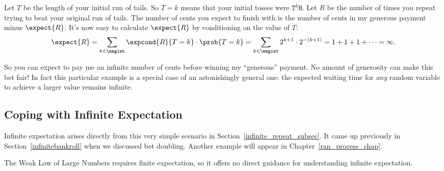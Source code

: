 Let $T$ be the length of your initial run of tails.  So $T = k$ means
that your initial tosses were $\texttt{T}^k\texttt{H}$.  Let $R$ be
the number of times you repeat trying to beat your original run of
tails.  The number of cents you expect to finish with is the number of
cents in my generous payment minus $\expect{R}$.  It's now easy to
calculate $\expect{R}$ by conditioning on the value of $T$:
\[
\expect{R}
     = \sum_{k \in \nngint} \expcond{R}{T=k} \cdot \prob{T=k}
     = \sum_{k \in \nngint}  2^{k+1} \cdot 2^{-(k+1)}
     = 1 + 1 + 1+ \cdots = \infty.
\]

\iffalse
\begin{align*}
\expect{R}
    & = \sum_{k \in \nngint} \expcond{R}{T=k} \cdot \prob{T=k}\\
    & = \sum_{k \in \nngint}  2^{k+1} \cdot 2^{-(k+1)}\\
    & = \sum_{k \in \nngint} 1 = \infty.
\end{align*}
\fi

So you can expect to pay me an infinite number of cents before winning
my ``generous'' payment.  No amount of generosity can make this bet
fair!  In fact this particular example is a special case of an
astonishingly general one: \iffalse worked out in
Problem~\ref{PS_infinite_repeat_expectation}\fi the expected waiting
time for \emph{any} random variable to achieve a larger value remains
infinite.

\begin{editingnotes}
\subsection{Coping with Infinite Expectation}

Infinite expectation arises directly from this very simple scenario in
Section~\ref{infinite_repeat_subsec}.  It came up previously in
Section~\ref{infinitebankroll} when we discussed bet doubling.
Another example will appear in Chapter~\ref{ran_process_chap}.

The Weak Law of Large Numbers requires finite expectation, so it
offers no direct guidance for understanding infinite expectation.
\end{editingnotes}

\begin{problems}
\classproblems
{}

\examproblems
{}
\end{problems}

